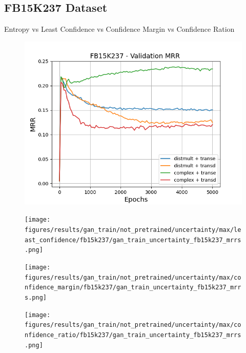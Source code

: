 \subsection{FB15K237 Dataset}

Entropy 
vs 
Least Confidence 
vs 
Confidence Margin 
vs 
Confidence Ration

\begin{figure}
    \centering
    \begin{minipage}{.5\textwidth}
      \centering
      \includegraphics[width=0.9\linewidth]{figures/results/gan_train/not_pretrained/uncertainty/max/entropy/fb15k237/gan_train_uncertainty_fb15k237_mrrs.png}
    \end{minipage}%
    \begin{minipage}{.5\textwidth}
      \centering
      \texttt{[image: figures/results/gan\_train/not\_pretrained/uncertainty/max/least\_confidence/fb15k237/gan\_train\_uncertainty\_fb15k237\_mrrs.png]}
    \end{minipage}
    \begin{minipage}{.5\textwidth}
      \centering
      \texttt{[image: figures/results/gan\_train/not\_pretrained/uncertainty/max/confidence\_margin/fb15k237/gan\_train\_uncertainty\_fb15k237\_mrrs.png]}
    \end{minipage}%
    \begin{minipage}{.5\textwidth}
      \centering
      \texttt{[image: figures/results/gan\_train/not\_pretrained/uncertainty/max/confidence\_ratio/fb15k237/gan\_train\_uncertainty\_fb15k237\_mrrs.png]}
    \end{minipage}%
    \caption{}
    \label{fig:advtrain_metrics_fb15k237}
\end{figure}

